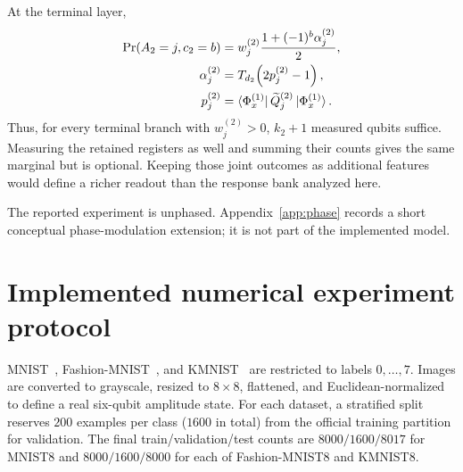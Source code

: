 \documentclass[pdflatex,sn-mathphys,NameDate,iicol]{sn-jnl}
\begin{document}
At the terminal layer,
\begin{align}
 \Pr(A_2=j,c_2=b)
 &=w_j^{(2)}\frac{1+(-1)^b\alpha_j^{(2)}}{2},
 \\
 \alpha_j^{(2)}
 &=T_{d_2}\!\left(2p_j^{(2)}-1\right),
 \\
 p_j^{(2)}
 &=\bra{\Phi_x^{(1)}}\widetilde Q_j^{(2)}
     \ket{\Phi_x^{(1)}}.
 \label{eq:app-deep-marginal-response}
\end{align}
Thus, for every terminal branch with $w_j^{(2)}>0$, $k_2+1$ measured qubits
suffice. Measuring the retained registers as well and summing their counts
gives the same marginal but is optional. Keeping those joint outcomes as
additional features would define a richer readout than the response bank
analyzed here.

The reported experiment is unphased. Appendix~\ref{app:phase} records a
short conceptual phase-modulation extension; it is not part of the implemented
model.

\clearpage
\onecolumn
\twocolumn

\section{Implemented numerical experiment protocol}
\label{app:numerical-protocol}

MNIST~\citep{lecun1998gradient}, Fashion-MNIST~\citep{xiao2017fashion}, and
KMNIST~\citep{clanuwat2018deep} are restricted to labels $0,\ldots,7$.
Images are converted to grayscale, resized to $8\times8$, flattened, and
Euclidean-normalized to define a real six-qubit amplitude state. For each
dataset, a stratified split reserves $200$ examples per class ($1600$ in
total) from the official training partition for validation.
The final train/validation/test counts are $8000/1600/8017$ for MNIST8 and
$8000/1600/8000$ for each of Fashion-MNIST8 and KMNIST8.
\end{document}
